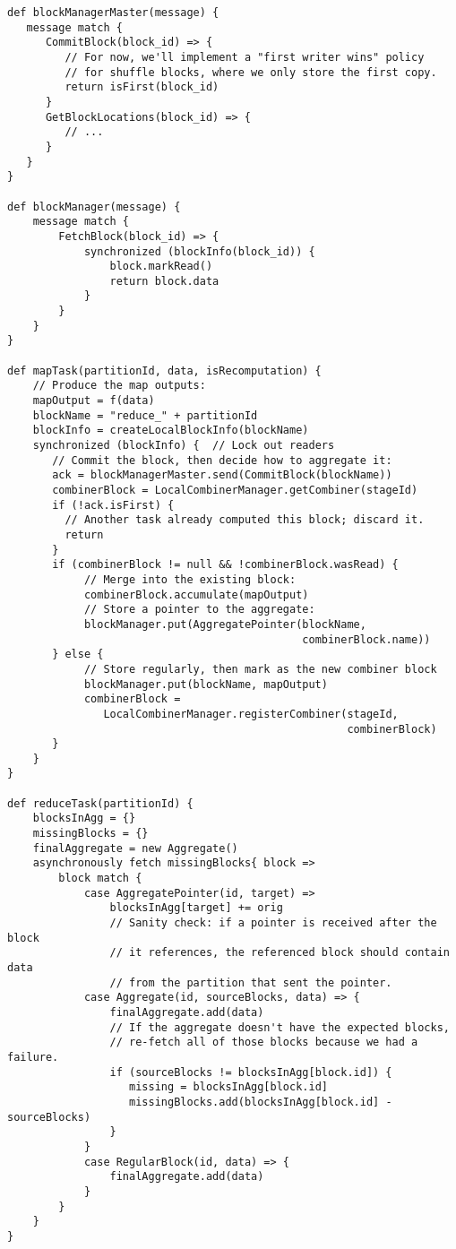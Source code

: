 \documentclass[12pt]{article}
\begin{document}
\begin{verbatim}
def blockManagerMaster(message) {
   message match {
      CommitBlock(block_id) => {
         // For now, we'll implement a "first writer wins" policy
         // for shuffle blocks, where we only store the first copy.
         return isFirst(block_id)
      }
      GetBlockLocations(block_id) => {
         // ...
      }
   }
}

def blockManager(message) {
    message match {
        FetchBlock(block_id) => {
            synchronized (blockInfo(block_id)) {
                block.markRead()
                return block.data
            }
        }
    }
}

def mapTask(partitionId, data, isRecomputation) {
    // Produce the map outputs:
    mapOutput = f(data)
    blockName = "reduce_" + partitionId
    blockInfo = createLocalBlockInfo(blockName)
    synchronized (blockInfo) {  // Lock out readers
       // Commit the block, then decide how to aggregate it:
       ack = blockManagerMaster.send(CommitBlock(blockName))
       combinerBlock = LocalCombinerManager.getCombiner(stageId)
       if (!ack.isFirst) {
         // Another task already computed this block; discard it.
         return
       }
       if (combinerBlock != null && !combinerBlock.wasRead) {
            // Merge into the existing block:
            combinerBlock.accumulate(mapOutput)
            // Store a pointer to the aggregate:
            blockManager.put(AggregatePointer(blockName,
                                              combinerBlock.name))
       } else {
            // Store regularly, then mark as the new combiner block
            blockManager.put(blockName, mapOutput)
            combinerBlock =
               LocalCombinerManager.registerCombiner(stageId,
                                                     combinerBlock)
       }
    }
}

def reduceTask(partitionId) {
    blocksInAgg = {}
    missingBlocks = {}
    finalAggregate = new Aggregate()
    asynchronously fetch missingBlocks{ block =>
        block match {
            case AggregatePointer(id, target) =>
                blocksInAgg[target] += orig
                // Sanity check: if a pointer is received after the block
                // it references, the referenced block should contain data
                // from the partition that sent the pointer.
            case Aggregate(id, sourceBlocks, data) => {
                finalAggregate.add(data)
                // If the aggregate doesn't have the expected blocks,
                // re-fetch all of those blocks because we had a failure.
                if (sourceBlocks != blocksInAgg[block.id]) {
                   missing = blocksInAgg[block.id]
                   missingBlocks.add(blocksInAgg[block.id] - sourceBlocks)
                }
            }
            case RegularBlock(id, data) => {
                finalAggregate.add(data)
            }
        }
    }
}
\end{verbatim}
\end{document}
